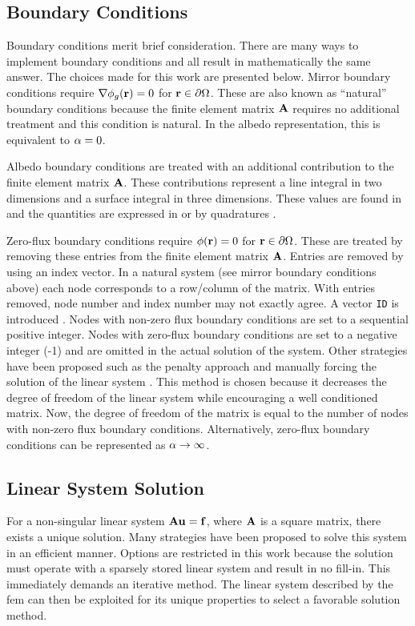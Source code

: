   \subsection{Boundary Conditions}
    \label{sec:boundary_conditions}
    Boundary conditions merit brief consideration. There are many ways to 
    implement boundary conditions and all result in mathematically the same 
    answer. The choices made for this work are presented below. Mirror 
    boundary conditions require $\mathbf{\nabla} \phi_g(\mathbf{r}) = 0$ for 
    $\mathbf{r} \in \partial \Omega$. These are also known as ``natural'' boundary
    conditions because the finite element matrix $\mathbf{A}$ requires no additional 
    treatment and this condition is natural. In the albedo representation, this
    is equivalent to $\alpha = 0$.
    
    Albedo boundary conditions are treated with an additional contribution to 
    the finite element matrix $\mathbf{A}$. These contributions represent a line 
    integral in two dimensions and a surface integral in three dimensions. These
    values are found in  and the quantities are 
    expressed in  or by quadratures 
    .
    
    Zero-flux boundary conditions require $\phi(\mathbf{r}) = 0$ for 
    $\mathbf{r} \in \partial \Omega$. These are treated by removing these entries from
    the finite element matrix $\mathbf{A}$. Entries are removed by using an index 
    vector. In a natural system (see mirror boundary conditions above) each node
    corresponds to a row/column of the matrix. With entries removed, node number
    and index number may not exactly agree. A vector \texttt{ID} is introduced
    \cite{textbookjohnson}. Nodes with non-zero flux boundary conditions are set
    to a sequential positive integer. Nodes with zero-flux boundary conditions 
    are set to a negative integer (-1) and are omitted in the actual solution of 
    the system. Other strategies have been proposed such as the penalty approach 
    \cite{textbookhughes} and manually forcing the solution of the linear system 
    \cite{textbookli}. This method is chosen because it decreases the degree of 
    freedom of the linear system while encouraging a well conditioned matrix. 
    Now, the degree of freedom of the matrix is equal to the number of nodes 
    with non-zero flux boundary conditions. Alternatively, zero-flux boundary
    conditions can be represented as $\alpha \rightarrow \infty$.
    
  \subsection{Linear System Solution}
    \label{sec:linear_system_solution}
    For a non-singular linear system $\mathbf{A} \mathbf{u} = \mathbf{f}$, where $\mathbf{A}$ is a square 
    matrix, there exists a unique solution. Many strategies have been proposed 
    to solve this system in an efficient manner. Options are restricted in this
    work because the solution must operate with a sparsely stored linear 
    system and result in no fill-in. This immediately demands an iterative 
    method. The linear system described by the \gls{fem} can then be exploited 
    for its unique properties to select a favorable solution method.
    

